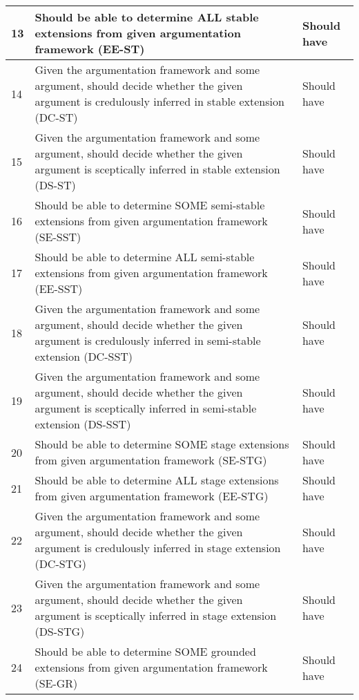 \begin{center}
\begin{longtable}{| p{} | p{} | p{} |}
13 & Should be able to determine ALL stable extensions from given argumentation framework (EE-ST)                                                            & Should have \\ \hline
14 & Given the argumentation framework and some argument, should decide whether the given argument is credulously inferred in stable extension (DC-ST)       & Should have \\ \hline
15 & Given the argumentation framework and some argument, should decide whether the given argument is sceptically inferred in stable extension (DS-ST)       & Should have \\ \hline
16 & Should be able to determine SOME semi-stable extensions from given argumentation framework (SE-SST)                                                     & Should have \\ \hline
17 & Should be able to determine ALL semi-stable extensions from given argumentation framework (EE-SST)                                                      & Should have \\ \hline
18 & Given the argumentation framework and some argument, should decide whether the given argument is credulously inferred in semi-stable extension (DC-SST) & Should have \\ \hline
19 & Given the argumentation framework and some argument, should decide whether the given argument is sceptically inferred in semi-stable extension (DS-SST) & Should have \\ \hline
20 & Should be able to determine SOME stage extensions from given argumentation framework (SE-STG)                                                           & Should have \\ \hline
21 & Should be able to determine ALL stage extensions from given argumentation framework (EE-STG)                                                            & Should have \\ \hline
22 & Given the argumentation framework and some argument, should decide whether the given argument is credulously inferred in stage extension (DC-STG)       & Should have \\ \hline
23 & Given the argumentation framework and some argument, should decide whether the given argument is sceptically inferred in stage extension (DS-STG)       & Should have \\ \hline
24 & Should be able to determine SOME grounded extensions from given argumentation framework (SE-GR)                                                         & Should have \\ \hline

\end{longtable}
\end{center}
